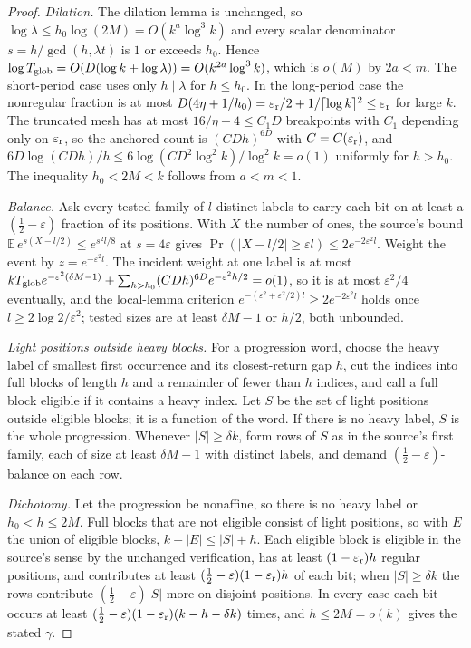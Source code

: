 \documentclass[11pt]{article}
\begin{document}
\begin{proof}
\emph{Dilation.} The dilation lemma is unchanged, so
$\log\lambda\le h_0\log(2M)=O(k^a\log^3k)$ and every scalar denominator
$s=h/\gcd(h,\lambda t)$ is $1$ or exceeds $h_0$. Hence
$\log T_{\rm glob}=O(D(\log k+\log\lambda))=O(k^{2a}\log^3k)$, which is
$o(M)$ by $2a<m$. The short-period case uses only $h\mid\lambda$ for
$h\le h_0$. In the long-period case the nonregular fraction is at most
$D(4\eta+1/h_0)=\varepsilon_{\rm r}/2+1/\lceil\log k\rceil^2\le\varepsilon_{\rm r}$
for large $k$. The truncated mesh has at most $16/\eta+4\le C_1D$
breakpoints with $C_1$ depending only on $\varepsilon_{\rm r}$, so the
anchored count is $(CDh)^{6D}$ with $C=C(\varepsilon_{\rm r})$, and
$6D\log(CDh)/h\le6\log(CD^2\log^2k)/\log^2k=o(1)$ uniformly for
$h>h_0$. The inequality $h_0<2M<k$ follows from $a<m<1$.

\emph{Balance.} Ask every tested family of $l$ distinct labels to carry
each bit on at least a $(\frac12-\varepsilon)$ fraction of its positions.
With $X$ the number of ones, the source's bound
$\mathbb{E}\,e^{s(X-l/2)}\le e^{s^2l/8}$ at $s=4\varepsilon$ gives
$\Pr(|X-l/2|\ge\varepsilon l)\le2e^{-2\varepsilon^2l}$.
Weight the event by $z=e^{-\varepsilon^2l}$. The incident weight at one
label is at most $kT_{\rm glob}e^{-\varepsilon^2(\delta M-1)}+
\sum_{h>h_0}(CDh)^{6D}e^{-\varepsilon^2h/2}=o(1)$, so it is at most
$\varepsilon^2/4$ eventually, and the local-lemma criterion
$e^{-(\varepsilon^2+\varepsilon^2/2)l}\ge2e^{-2\varepsilon^2l}$ holds once
$l\ge2\log2/\varepsilon^2$; tested sizes are at least $\delta M-1$ or
$h/2$, both unbounded.

\emph{Light positions outside heavy blocks.} For a progression word,
choose the heavy label of smallest first occurrence and its closest-return
gap $h$, cut the indices into full blocks of length $h$ and a remainder
of fewer than $h$ indices, and call a full block eligible if it contains
a heavy index. Let $S$ be the set of light positions outside eligible
blocks; it is a function of the word. If there is no heavy label,
$S$ is the whole progression. Whenever $|S|\ge\delta k$, form rows of
$S$ as in the source's first family, each of size at least
$\delta M-1$ with distinct labels, and demand
$(\frac12-\varepsilon)$-balance on each row.

\emph{Dichotomy.} Let the progression be nonaffine, so there is no heavy
label or $h_0<h\le2M$. Full blocks that are not eligible consist of
light positions, so with $E$ the union of eligible blocks,
$k-|E|\le|S|+h$. Each eligible block is eligible in the source's sense
by the unchanged verification, has at least $(1-\varepsilon_{\rm r})h$
regular positions, and contributes at least
$(\frac12-\varepsilon)(1-\varepsilon_{\rm r})h$ of each bit; when
$|S|\ge\delta k$ the rows contribute $(\frac12-\varepsilon)|S|$ more on
disjoint positions. In every case each bit occurs at least
$(\frac12-\varepsilon)(1-\varepsilon_{\rm r})(k-h-\delta k)$ times, and
$h\le2M=o(k)$ gives the stated $\gamma$.


\end{proof}
\end{document}
